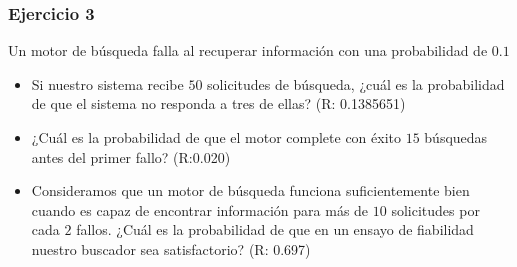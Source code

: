 \documentclass[
]{book}
\begin{document}
\hypertarget{ejercicio-3-4}{%
\subsubsection{Ejercicio 3}\label{ejercicio-3-4}}

Un motor de búsqueda falla al recuperar información con una probabilidad de \(0.1\)

\begin{itemize}
\item
  Si nuestro sistema recibe \(50\) solicitudes de búsqueda, ¿cuál es la probabilidad de que el sistema no responda a tres de ellas? (R: 0.1385651)
\item
  ¿Cuál es la probabilidad de que el motor complete con éxito \(15\) búsquedas antes del primer fallo? (R:0.020)
\item
  Consideramos que un motor de búsqueda funciona suficientemente bien cuando es capaz de encontrar información para más de \(10\) solicitudes por cada \(2\) fallos. ¿Cuál es la probabilidad de que en un ensayo de fiabilidad nuestro buscador sea satisfactorio? (R: 0.697)
\end{itemize}

  
\end{document}
